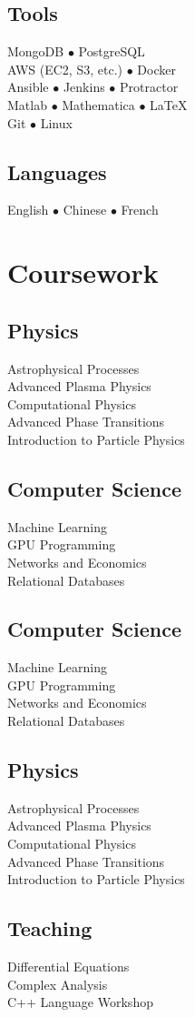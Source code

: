 \documentclass[]{yubo-resume-openfont}
\begin{document}
\begin{minipage}[t]{0.33\textwidth}
    \subsection{Tools}
    MongoDB $\bullet$ PostgreSQL \\
    AWS (EC2, S3, etc.) $\bullet$ Docker\\
    Ansible $\bullet$ Jenkins $\bullet$ Protractor\\
    Matlab $\bullet$ Mathematica $\bullet$ \LaTeX\\
    Git $\bullet$ Linux\\
    \sectionsep
    \subsection{Languages}
    English $\bullet$ Chinese $\bullet$ French
    \sectionsep




\def\PhWork{
    \subsection{Physics}
        Astrophysical Processes\\
        Advanced Plasma Physics\\
        Computational Physics\\
        Advanced Phase Transitions\\
        Introduction to Particle Physics\\
}
\def\CSWork{
    \subsection{Computer Science}
        Machine Learning\\
        GPU Programming\\
        Networks and Economics\\
        Relational Databases
}

\section{Coursework}
    \ifisCS
        \PhWork
        \sectionsep
        \CSWork
    \else
        \CSWork
        \sectionsep
        \PhWork
    \fi
    \sectionsep

    \subsection{Teaching}
        Differential Equations\\
        Complex Analysis\\
        C++ Language Workshop
    \sectionsep

%
%

\end{minipage}
\end{document}
